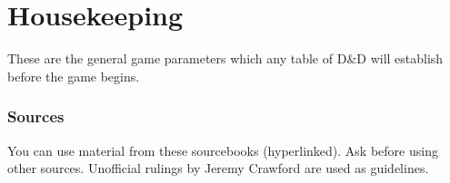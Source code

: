 \documentclass[letterpaper,twocolumn,openany,nodeprecatedcode]{dndbook}
\begin{document}
%
%


\chapter{Housekeeping}

These are the general game parameters which any table of D\&D will establish before the game begins.

\subsection{Sources}
You can use material from these sourcebooks (hyperlinked). Ask before using other sources. Unofficial rulings by Jeremy Crawford are used as guidelines.
\end{document}
